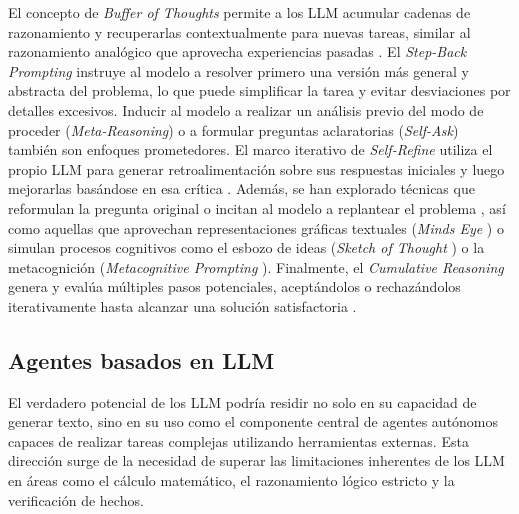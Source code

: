 El concepto de \textit{Buffer of Thoughts} permite a los LLM acumular cadenas de razonamiento y recuperarlas contextualmente para nuevas tareas, similar al razonamiento analógico que aprovecha experiencias pasadas \citep{yangBufferThoughtsThoughtAugmented2024, yasunagaLargeLanguageModels2024}. El \textit{Step-Back Prompting} instruye al modelo a resolver primero una versión más general y abstracta del problema, lo que puede simplificar la tarea y evitar desviaciones por detalles excesivos. Inducir al modelo a realizar un análisis previo del modo de proceder (\textit{Meta-Reasoning}) \citep{gaoMetaReasoningLarge2024} o a formular preguntas aclaratorias (\textit{Self-Ask}) \citep{pressMeasuringNarrowingCompositionality2023} también son enfoques prometedores. El marco iterativo de \textit{Self-Refine} utiliza el propio LLM para generar retroalimentación sobre sus respuestas iniciales y luego mejorarlas basándose en esa crítica \citep{madaanSelfRefineIterativeRefinement2023}. Además, se han explorado técnicas que reformulan la pregunta original o incitan al modelo a replantear el problema \citep{mishraReframingInstructionalPrompts2022, dengRephraseRespondLet2024}, así como aquellas que aprovechan representaciones gráficas textuales (\textit{Minds Eye} \citep{wuMindsEyeLLMs}) o simulan procesos cognitivos como el esbozo de ideas (\textit{Sketch of Thought} \citep{aytesSketchofThoughtEfficientLLM2025}) o la metacognición (\textit{Metacognitive Prompting} \citep{wangMetacognitivePromptingImproves2024}). Finalmente, el \textit{Cumulative Reasoning} genera y evalúa múltiples pasos potenciales, aceptándolos o rechazándolos iterativamente hasta alcanzar una solución satisfactoria \citep{zhangCumulativeReasoningLarge2025}.

\subsection{Agentes basados en LLM}
\label{subsec:agentes_basados_llm}

El verdadero potencial de los LLM podría residir no solo en su capacidad de generar texto, sino en su uso como el componente central de agentes autónomos capaces de realizar tareas complejas utilizando herramientas externas. Esta dirección surge de la necesidad de superar las limitaciones inherentes de los LLM en áreas como el cálculo matemático, el razonamiento lógico estricto y la verificación de hechos.

